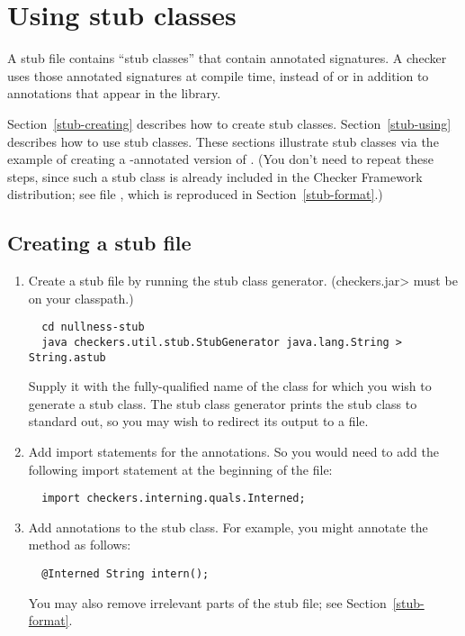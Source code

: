 \section{Using stub classes\label{stub}\label{stub-creating-and-using}}

A stub file contains ``stub classes'' that contain annotated signatures.  A
checker uses those annotated signatures at compile time, instead of or in
addition to annotations that appear in the library.

Section~\ref{stub-creating} describes how to create stub classes.
Section~\ref{stub-using} describes how to use stub classes.
These sections illustrate stub classes via the example of creating a -annotated
version of .  (You don't need to repeat these steps,
since such a stub class is already included in the Checker Framework
distribution; see file , which
is reproduced in Section~\ref{stub-format}.)


\subsection{Creating a stub file\label{stub-creating}}

\begin{enumerate}

\item
  Create a stub file by running the stub class generator.  (\<checkers.jar>
  must be on your classpath.)

\begin{Verbatim}
  cd nullness-stub
  java checkers.util.stub.StubGenerator java.lang.String > String.astub
\end{Verbatim}

  Supply it with the fully-qualified name of the class for which you wish to
  generate a stub class.  The stub class generator prints the
  stub class to standard out, so you may wish to redirect its output to a
  file.

\item
  Add import statements for the annotations.  So you would need to
add the following import statement at the beginning of the file:

\begin{Verbatim}
  import checkers.interning.quals.Interned;
\end{Verbatim}

\item
  Add annotations to the stub class.  For example, you might annotate
  the  method as follows:

\begin{Verbatim}
  @Interned String intern();
\end{Verbatim}

  You may also remove irrelevant parts of the stub file; see
  Section~\ref{stub-format}.

\end{enumerate}

